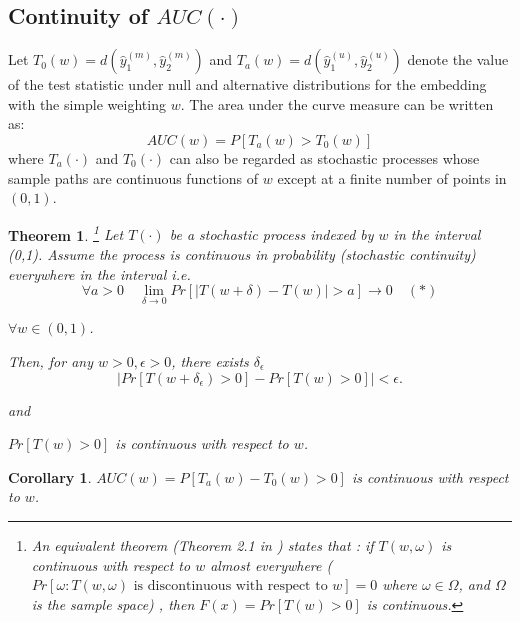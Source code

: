 \documentclass[12pt]{article} %
\newtheorem{thm}{Theorem}
\newtheorem{cor}{Corollary}
\begin{document}
 
\subsection{Continuity of $AUC(\cdot)$} 
 Let $T_0(w)=d(\hat{y}_{1}^{{(m)}},\hat{y}_{2}^{{(m)}})$ and $T_a(w)=d(\hat{y}_{1}^{(u)},\hat{y}_{2}^{(u)})$ denote the value of the test statistic under null and alternative distributions  for the embedding with the simple weighting $w$.  %
The area under the curve measure can be written as: $$AUC(w)=P\left[T_a(w)>T_0(w)\right]$$ where $T_a(\cdot)$ and $T_0(\cdot)$ can also be regarded as  stochastic processes whose sample paths are continuous functions of $w$ except at a finite number of points in $(0,1)$.


\begin{thm}\footnote{
An equivalent theorem  (Theorem 2.1 in \cite{Norkin1993}) states that :  if $T(w,\omega)$ is continuous with respect to $w$  almost everywhere 
($Pr[\omega:T(w,\omega)\textrm{ is discontinuous with respect to } w]=0$  where $\omega \in \Omega$, and $\Omega$ is the sample space)
, then $F(x)=Pr\left[T(w)>0\right]$ is continuous.}
Let $T(\cdot)$ be  a stochastic process indexed by $w$ in the interval (0,1). Assume  the process is continuous in probability  (stochastic continuity)   everywhere in the interval  i.e.
$$ \forall a>0 \quad  \lim_{\delta \rightarrow 0} Pr\left[\left|T(w+\delta)-T(w) \right|>a \right] \rightarrow 0 \quad(*)$$ 

 $\forall w\in (0,1)$.

Then, for any $w>0, \epsilon>0$, there exists $\delta_{\epsilon}$ $$\left| Pr\left[T(w+\delta_{\epsilon})>0 \right]- Pr\left[T(w)>0 \right]\right|<\epsilon .  $$

and 

$Pr \left[ T(w)>0\right]$ is continuous with respect to $w$.
\end{thm}

\begin{cor}{
 $AUC(w)=P\left[T_a(w)-T_0(w) >0 \right]$ is continuous with respect to $w$.}
\end{cor}
\end{document}

